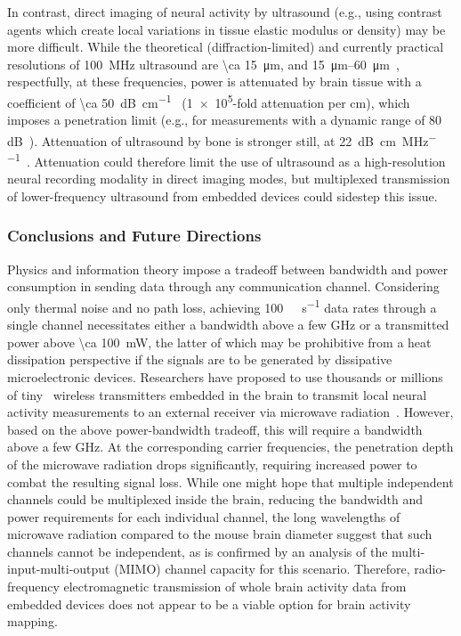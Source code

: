 In contrast, direct imaging of neural activity by ultrasound (e.g., using contrast agents which create local variations in tissue elastic modulus or density) may be more difficult.
While the theoretical (diffraction-limited) and currently practical resolutions of  \SI{100}{\mega\hertz} ultrasound are \SI{\ca 15}{\micro\meter}, and \SIrange{15}{60}{\um}~\cite{foster00}, respectfully, at these frequencies, power is attenuated by brain tissue with a coefficient of \SI{\ca 50}{\dB\per\centi\meter}~\cite{hoskins10} (\num{1e5}-fold attenuation per cm), which imposes a penetration limit (e.g., for
measurements with a dynamic range of 80 dB~\cite{foster00}).
Attenuation of ultrasound by bone is stronger still, at \SI{22}{\dB\per\cm\per\MHz}~\cite{hoskins10}.
Attenuation could therefore limit the use of ultrasound as a high-resolution neural recording modality in direct imaging modes, but multiplexed transmission of lower-frequency ultrasound from embedded devices could sidestep this issue.

\subsubsection{Conclusions and Future Directions}

Physics and information theory impose a tradeoff between bandwidth and power consumption in sending data through any communication channel.
Considering only thermal noise and no path loss, achieving \SI{100}{\giga\bit\per\second} data rates through a single channel necessitates either a bandwidth above a few \si{\giga\hertz} or a transmitted power above \SI{\ca 100}{\milli\watt}, the latter of which may be prohibitive from a heat dissipation perspective if the signals are to be generated by dissipative microelectronic devices.
Researchers have proposed to use thousands or millions of tiny~\cite{gomez10} wireless transmitters embedded in the brain to transmit local neural activity measurements to an external receiver via microwave radiation~\cite{dyson09}.
However, based on the above power-bandwidth tradeoff, this will require a bandwidth above a few \si{\giga\hertz}.
At the corresponding carrier frequencies, the penetration depth of the microwave radiation drops significantly, requiring increased power to combat the resulting signal loss.
While one might hope that multiple independent channels could be multiplexed inside the brain, reducing the bandwidth and power requirements for each individual channel, the long wavelengths of microwave radiation compared to the mouse brain diameter suggest that such channels cannot be independent, as is confirmed by an analysis of the multi-input-multi-output (MIMO) channel capacity for this scenario.
Therefore, radio-frequency electromagnetic transmission of whole brain activity data from embedded devices does not appear to be a viable option for brain activity mapping.

